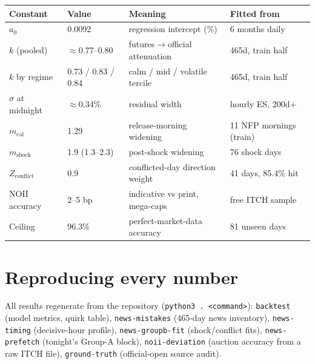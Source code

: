 \documentclass[11pt,a4paper]{article}
\begin{document}
\begin{center}
\small
\begin{tabular}{llll}
\toprule
Constant & Value & Meaning & Fitted from \\
\midrule
$a_0$ & 0.0092 & regression intercept (\%) & 6 months daily \\
$k$ (pooled) & $\approx$0.77--0.80 & futures$\to$official attenuation & 465d, train half \\
$k$ by regime & 0.73 / 0.83 / 0.84 & calm / mid / volatile tercile & 465d, train half \\
$\sigma$ at midnight & $\approx$0.34\% & residual width & hourly ES, 200d+ \\
$m_{\text{cal}}$ & 1.29 & release-morning widening & 11 NFP mornings (train) \\
$m_{\text{shock}}$ & 1.9 (1.3--2.3) & post-shock widening & 76 shock days \\
$Z_{\text{conflict}}$ & 0.9 & conflicted-day direction weight & 41 days, 85.4\% hit \\
NOII accuracy & 2--5 bp & indicative vs print, mega-caps & free ITCH sample \\
Ceiling & 96.3\% & perfect-market-data accuracy & 81 unseen days \\
\bottomrule
\end{tabular}
\end{center}

\section{Reproducing every number}

All results regenerate from the repository (\texttt{python3 .\ <command>}):
\texttt{backtest} (model metrics, quirk table), \texttt{news-mistakes}
(465-day news inventory), \texttt{news-timing} (decisive-hour profile),
\texttt{news-groupb-fit} (shock/conflict fits), \texttt{news-prefetch}
(tonight's Group-A block), \texttt{noii-deviation} (auction accuracy from a
raw ITCH file), \texttt{ground-truth} (official-open source audit).
\end{document}
